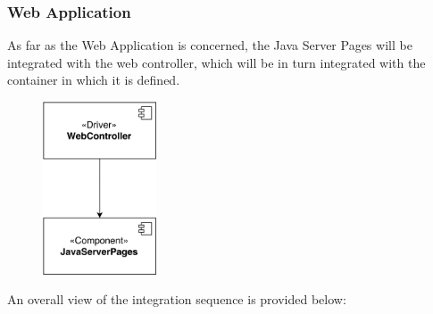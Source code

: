 \subsubsection{Web Application}
As far as the Web Application is concerned, the Java Server Pages will be integrated with the web controller, which will be in turn integrated with the container in which it is defined.

\begin{figure}[H]
\begin{center}
		\includegraphics[width=0.3\textwidth]{./integration_strategy/diagrams/web.png}
\end{center}
\end{figure}

An overall view of the integration sequence is provided below:


